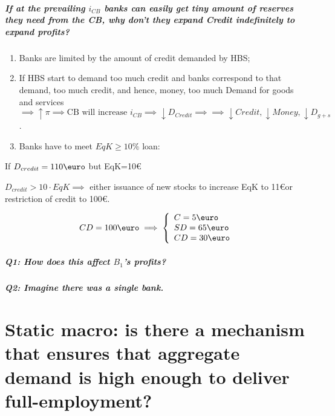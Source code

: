 \documentclass{report}
\begin{document}
\paragraph{If at the prevailing $i_{CB}$ banks can easily get tiny amount of reserves they need from the CB, why don't they expand Credit indefinitely to expand profits?}
\begin{enumerate}
    \item Banks are limited by the amount of credit demanded by HBS; 
    \item If HBS start to demand too much credit and banks correspond to that demand, too much credit, and hence, money, too much Demand for goods and services $\implies \uparrow \pi \implies \text{CB will increase } i_{CB} \implies \downarrow D_{Credit} \implies \implies \downarrow Credit, \downarrow Money, \downarrow D_{g+s}$.
    \item Banks have to meet $EqK \geq 10\%$ loan:
\end{enumerate}


If $D_{credit}=110\text{\euro}$ but EqK=10\euro

$D_{credit}>10\cdot EqK \implies$ either issuance of new stocks to increase EqK to 11\euro or restriction of credit to 100\euro. 

\[ 
CD=100 \text{\euro} \implies \left\{
\begin{array}{l l}
    C=5\text{\euro} \\
    SD=65\text{\euro} \\
    CD=30\text{\euro}
\end{array}
\right.
\]

\paragraph{Q1: How does this affect $B_1$'s profits?}
\paragraph{Q2: Imagine there was a single bank.}



\chapter{Static macro: is there a mechanism that ensures that aggregate demand is high enough to deliver full-employment?}
\end{document}
